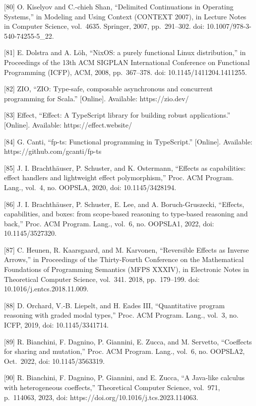 \documentclass[
  10
]{article}
\begin{document}
{[}80{]} O. Kiselyov and C.-chieh Shan, ``Delimited Continuations in Operating
Systems,'' in Modeling and Using Context (CONTEXT 2007), in Lecture Notes in
Computer Science, vol.~4635. Springer, 2007, pp.~291--302. doi:
10.1007/978-3-540-74255-5\_22.

{[}81{]} E. Dolstra and A. Löh, ``NixOS: a purely functional Linux distribution,'' in
Proceedings of the 13th ACM SIGPLAN International Conference on Functional
Programming (ICFP), ACM, 2008, pp.~367--378. doi: 10.1145/1411204.1411255.

{[}82{]} ZIO, ``ZIO: Type-safe, composable asynchronous and concurrent programming
for Scala.'' {[}Online{]}. Available: https://zio.dev/

{[}83{]} Effect, ``Effect: A TypeScript library for building robust applications.''
{[}Online{]}. Available: https://effect.website/

{[}84{]} G. Canti, ``fp-ts: Functional programming in TypeScript.'' {[}Online{]}.
Available: https://github.com/gcanti/fp-ts

{[}85{]} J. I. Brachthäuser, P. Schuster, and K. Ostermann, ``Effects as capabilities:
effect handlers and lightweight effect polymorphism,'' Proc. ACM Program. Lang.,
vol.~4, no. OOPSLA, 2020, doi: 10.1145/3428194.

{[}86{]} J. I. Brachthäuser, P. Schuster, E. Lee, and A. Boruch-Gruszecki, ``Effects,
capabilities, and boxes: from scope-based reasoning to type-based reasoning and
back,'' Proc. ACM Program. Lang., vol.~6, no. OOPSLA1, 2022, doi: 10.1145/3527320.

{[}87{]} C. Heunen, R. Kaarsgaard, and M. Karvonen, ``Reversible Effects as Inverse
Arrows,'' in Proceedings of the Thirty-Fourth Conference on the Mathematical
Foundations of Programming Semantics (MFPS XXXIV), in Electronic Notes in
Theoretical Computer Science, vol.~341. 2018, pp.~179--199. doi:
10.1016/j.entcs.2018.11.009.

{[}88{]} D. Orchard, V.-B. Liepelt, and H. Eades III, ``Quantitative program
reasoning with graded modal types,'' Proc. ACM Program. Lang., vol.~3, no. ICFP,
2019, doi: 10.1145/3341714.

{[}89{]} R. Bianchini, F. Dagnino, P. Giannini, E. Zucca, and M. Servetto, ``Coeffects
for sharing and mutation,'' Proc. ACM Program. Lang., vol.~6, no. OOPSLA2,
Oct.~2022, doi: 10.1145/3563319.

{[}90{]} R. Bianchini, F. Dagnino, P. Giannini, and E. Zucca, ``A Java-like calculus
with heterogeneous coeffects,'' Theoretical Computer Science, vol.~971, p.~114063,
2023, doi: https://doi.org/10.1016/j.tcs.2023.114063.
\end{document}
